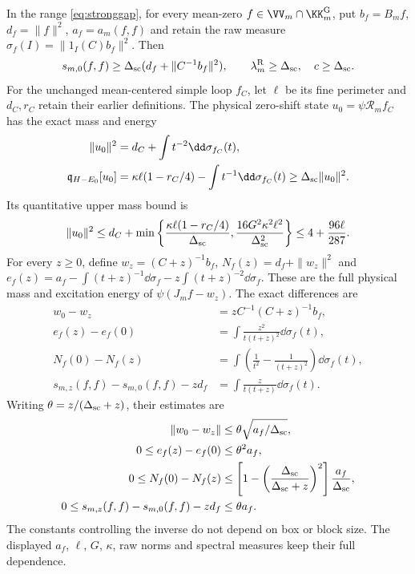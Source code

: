 \begin{theorem}\label{thm:uniformzero}
In the range \eqref{eq:stronggap}, for every mean-zero
$f\in\VV_m\cap\KK_m^{\rm G}$, put $b_f=B_mf$,
$d_f=\|f\|^2$, $a_f=a_m(f,f)$ and retain the raw measure
$\sigma_f(I)=\|1_I(C)b_f\|^2$.
Then
\begin{equation}\label{eq:uniformzeroenergy}
 s_{m,0}(f,f)\geq\Delta_{\rm sc}
              (d_f+\|C^{-1}b_f\|^2),\qquad
 \lambda_m^{\rm R}\geq\Delta_{\rm sc},\quad c\geq\Delta_{\rm sc}.
\end{equation}
For the unchanged mean-centered simple loop $f_C$, let
$\ell$ be its fine perimeter and $d_C,r_C$ retain their earlier
definitions. The physical zero-shift state $u_0=\psi\mathcal R_m f_C$
has the exact mass and energy
\begin{align}
 \|u_0\|^2&=d_C+\int t^{-2}\dd\sigma_{f_C}(t),\label{eq:uniformloopmass}\\
 \mathfrak q_{H-E_0}[u_0]
 &=\kappa\ell(1-r_C/4)-\int t^{-1}\dd\sigma_{f_C}(t)
 \geq\Delta_{\rm sc}\|u_0\|^2.\label{eq:uniformloopenergy}
\end{align}
Its quantitative upper mass bound is
\begin{equation}\label{eq:uniformloopbound}
 \|u_0\|^2\leq d_C+
 \min\left\{\frac{\kappa\ell(1-r_C/4)}{\Delta_{\rm sc}},
             \frac{16G^2\kappa^2\ell^2}{\Delta_{\rm sc}^2}\right\}
 \leq4+\frac{96\ell}{287}.
\end{equation}
For every $z\geq0$, define $w_z=(C+z)^{-1}b_f$,
$N_f(z)=d_f+\|w_z\|^2$ and
$e_f(z)=a_f-\int(t+z)^{-1}\dd\sigma_f
                    -z\int(t+z)^{-2}\dd\sigma_f$.
These are the full physical mass and excitation energy of
$\psi(J_mf-w_z)$. The exact differences are
\begin{align}
 w_0-w_z&=zC^{-1}(C+z)^{-1}b_f,\label{eq:uniformwdiff}\\
 e_f(z)-e_f(0)&=\int\frac{z^2}{t(t+z)^2}\dd\sigma_f(t),
                                                        \label{eq:uniformediff}\\
 N_f(0)-N_f(z)&=\int\left(\frac1{t^2}-\frac1{(t+z)^2}\right)
                                      \dd\sigma_f(t),    \label{eq:uniformndiff}\\
 s_{m,z}(f,f)-s_{m,0}(f,f)-zd_f
 &=\int\frac{z}{t(t+z)}\dd\sigma_f(t).    \label{eq:uniformmemorydiff}
\end{align}
Writing $\theta=z/(\Delta_{\rm sc}+z)$, their estimates are
\begin{align}
 \|w_0-w_z\|&\leq\theta\sqrt{a_f/\Delta_{\rm sc}},\nonumber\\
 0\leq e_f(z)-e_f(0)&\leq\theta^2a_f,\nonumber\\
 0\leq N_f(0)-N_f(z)&\leq
 \left[1-\left(\frac{\Delta_{\rm sc}}{\Delta_{\rm sc}+z}\right)^2\right]
 \frac{a_f}{\Delta_{\rm sc}},\nonumber\\
 0\leq s_{m,z}(f,f)-s_{m,0}(f,f)-zd_f&\leq\theta a_f.
                                                        \label{eq:uniformcontinuity}
\end{align}
The constants controlling the inverse do not depend on box or block
size. The displayed $a_f$, $\ell$, $G$, $\kappa$, raw norms and
spectral measures keep their full dependence.
\end{theorem}

